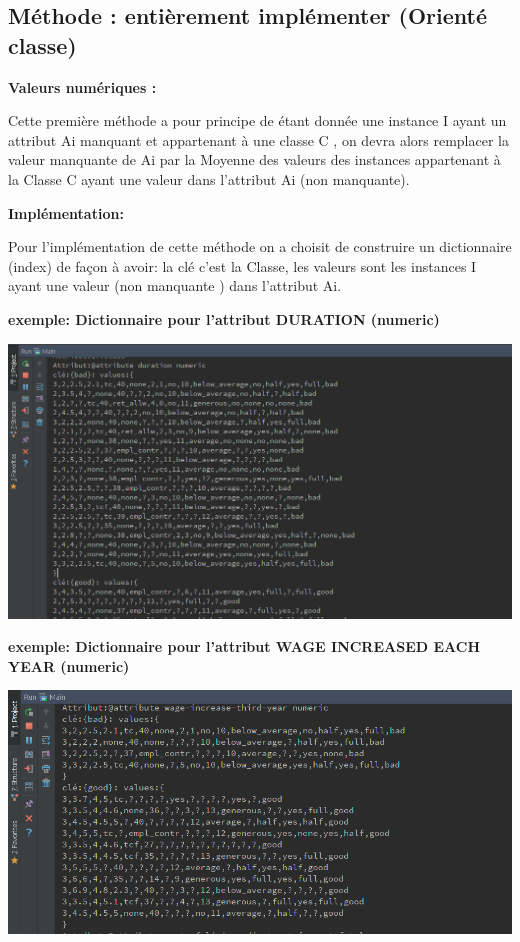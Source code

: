 \documentclass[12pt,a4paper,oneside]{book}
\begin{document}
\subsection{Méthode : entièrement implémenter (Orienté classe)}

\textbf{Valeurs numériques :}

Cette première méthode a pour principe de étant donnée une instance I ayant un attribut Ai manquant et appartenant à une classe C , on devra alors remplacer la valeur manquante de Ai par la Moyenne des valeurs des instances appartenant à la Classe C ayant une valeur dans l'attribut Ai (non manquante).

\textbf{Implémentation:}

Pour l'implémentation de cette méthode on a choisit de construire un dictionnaire (index) de façon à avoir: la clé c'est la Classe, les valeurs sont les instances I ayant une valeur (non manquante ) dans l'attribut Ai.

\textbf{exemple: Dictionnaire pour l'attribut DURATION (numeric)}
\begin{center}
	\includegraphics[width=1\textwidth]{screens/dic1.png}%
	\label{labelname}%
\end{center}

\textbf{exemple: Dictionnaire pour l'attribut WAGE INCREASED EACH YEAR (numeric)}
\begin{center}
	\includegraphics[width=1\textwidth]{screens/dic2.png}%
	\label{labelname}%
\end{center}
\end{document}
